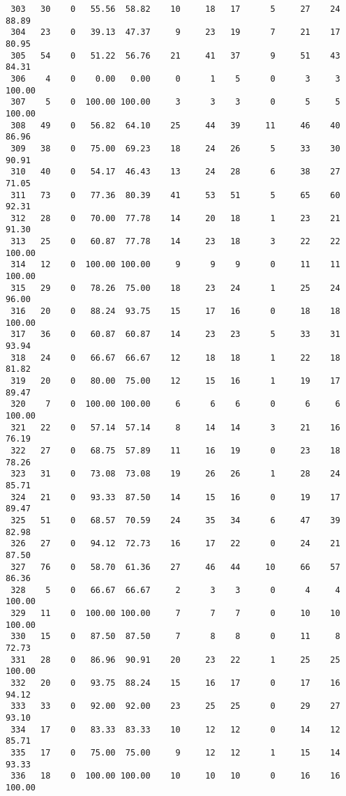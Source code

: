\begin{verbatim}
 303   30    0   55.56  58.82    10     18   17      5     27    24    88.89
 304   23    0   39.13  47.37     9     23   19      7     21    17    80.95
 305   54    0   51.22  56.76    21     41   37      9     51    43    84.31
 306    4    0    0.00   0.00     0      1    5      0      3     3   100.00
 307    5    0  100.00 100.00     3      3    3      0      5     5   100.00
 308   49    0   56.82  64.10    25     44   39     11     46    40    86.96
 309   38    0   75.00  69.23    18     24   26      5     33    30    90.91
 310   40    0   54.17  46.43    13     24   28      6     38    27    71.05
 311   73    0   77.36  80.39    41     53   51      5     65    60    92.31
 312   28    0   70.00  77.78    14     20   18      1     23    21    91.30
 313   25    0   60.87  77.78    14     23   18      3     22    22   100.00
 314   12    0  100.00 100.00     9      9    9      0     11    11   100.00
 315   29    0   78.26  75.00    18     23   24      1     25    24    96.00
 316   20    0   88.24  93.75    15     17   16      0     18    18   100.00
 317   36    0   60.87  60.87    14     23   23      5     33    31    93.94
 318   24    0   66.67  66.67    12     18   18      1     22    18    81.82
 319   20    0   80.00  75.00    12     15   16      1     19    17    89.47
 320    7    0  100.00 100.00     6      6    6      0      6     6   100.00
 321   22    0   57.14  57.14     8     14   14      3     21    16    76.19
 322   27    0   68.75  57.89    11     16   19      0     23    18    78.26
 323   31    0   73.08  73.08    19     26   26      1     28    24    85.71
 324   21    0   93.33  87.50    14     15   16      0     19    17    89.47
 325   51    0   68.57  70.59    24     35   34      6     47    39    82.98
 326   27    0   94.12  72.73    16     17   22      0     24    21    87.50
 327   76    0   58.70  61.36    27     46   44     10     66    57    86.36
 328    5    0   66.67  66.67     2      3    3      0      4     4   100.00
 329   11    0  100.00 100.00     7      7    7      0     10    10   100.00
 330   15    0   87.50  87.50     7      8    8      0     11     8    72.73
 331   28    0   86.96  90.91    20     23   22      1     25    25   100.00
 332   20    0   93.75  88.24    15     16   17      0     17    16    94.12
 333   33    0   92.00  92.00    23     25   25      0     29    27    93.10
 334   17    0   83.33  83.33    10     12   12      0     14    12    85.71
 335   17    0   75.00  75.00     9     12   12      1     15    14    93.33
 336   18    0  100.00 100.00    10     10   10      0     16    16   100.00

\end{verbatim}
